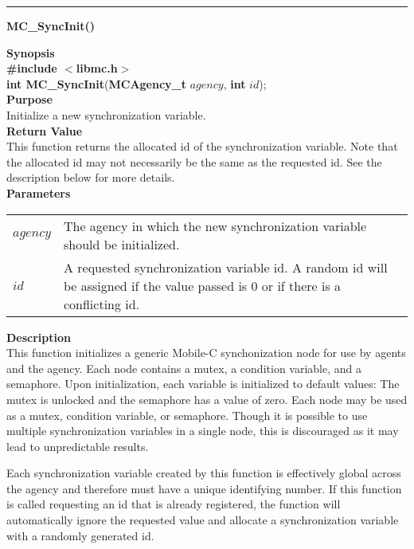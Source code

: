 \noindent
\vspace{5pt}
\rule{6.5in}{0.015in}
\noindent
{}
{\LARGE \bf MC\_SyncInit()}\\

\noindent
{\bf Synopsis}\\
{\bf \#include $<$libmc.h$>$}\\
{\bf int MC\_SyncInit}({\bf MCAgency\_t} $agency$, {\bf int} $id$);\\

\noindent
{\bf Purpose}\\
Initialize a new synchronization variable.\\

\noindent
{\bf Return Value}\\
This function returns the allocated id of the synchronization variable. Note 
that the allocated id may not necessarily be the same as the requested
id. See the description below for more details.\\

\noindent
{\bf Parameters}
\vspace{-0.1in}
\begin{description}
\item
\begin{tabular}{p{10 mm}p{145 mm}}
$agency$ & The agency in which the new synchronization variable should be 
initialized.\\
$id$ & A requested synchronization variable id. A random id will be assigned 
if the value passed is 0 or if there is a conflicting id.
\end{tabular}
\end{description}

\noindent
{\bf Description}\\
This function initializes a generic Mobile-C synchonization node for use
by agents and the agency. 
Each node contains a mutex, a condition variable, and a semaphore. 
Upon initialization, each variable is initialized to default values: 
The mutex is unlocked and the semaphore has a value of zero.
Each node may be used as a mutex, condition variable, or semaphore. 
Though it is possible to use multiple synchronization variables in a single 
node, this is discouraged as it may lead to unpredictable results. 

Each synchronization variable created by this function is effectively global
across the agency and therefore must have a unique identifying number. If
this function is called requesting an id that is already registered,
the function will automatically ignore the requested value and allocate
a synchronization variable with a randomly generated id.\\

